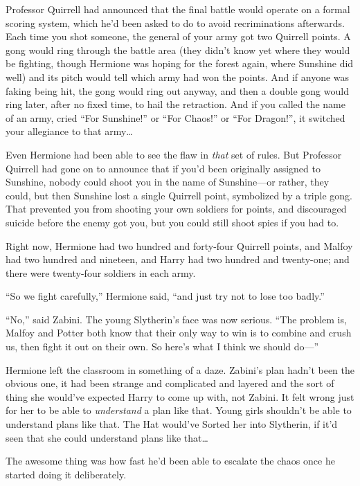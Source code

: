 Professor Quirrell had announced that the final battle would operate on a formal scoring system, which he’d been asked to do to avoid recriminations afterwards. Each time you shot someone, the general of your army got two Quirrell points. A gong would ring through the battle area (they didn’t know yet where they would be fighting, though Hermione was hoping for the forest again, where Sunshine did well) and its pitch would tell which army had won the points. And if anyone was faking being hit, the gong would ring out anyway, and then a double gong would ring later, after no fixed time, to hail the retraction. And if you called the name of an army, cried
“For Sunshine!” or
“For Chaos!” or
“For Dragon!”, it switched your allegiance to that army…

Even Hermione had been able to see the flaw in \emph{that} set of rules. But Professor Quirrell had gone on to announce that if you’d been originally assigned to Sunshine, nobody could shoot you in the name of Sunshine—or rather, they could, but then Sunshine lost a single Quirrell point, symbolized by a triple gong. That prevented you from shooting your own soldiers for points, and discouraged suicide before the enemy got you, but you could still shoot spies if you had to.

Right now, Hermione had two hundred and forty-four Quirrell points, and Malfoy had two hundred and nineteen, and Harry had two hundred and twenty-one; and there were twenty-four soldiers in each army.

“So we fight carefully,” Hermione said, “and just try not to lose too badly.”

“No,” said Zabini. The young Slytherin’s face was now serious.
“The problem is, Malfoy and Potter both know that their only way to win is to combine and crush us, then fight it out on their own. So here’s what I think we should do—”

Hermione left the classroom in something of a daze. Zabini’s plan hadn’t been the obvious one, it had been strange and complicated and layered and the sort of thing she would’ve expected Harry to come up with, not Zabini. It felt wrong just for her to be able to \emph{understand} a plan like that. Young girls shouldn’t be able to understand plans like that. The Hat would’ve Sorted her into Slytherin, if it’d seen that she could understand plans like that…

\later

The awesome thing was how fast he’d been able to escalate the chaos once he started doing it deliberately.


